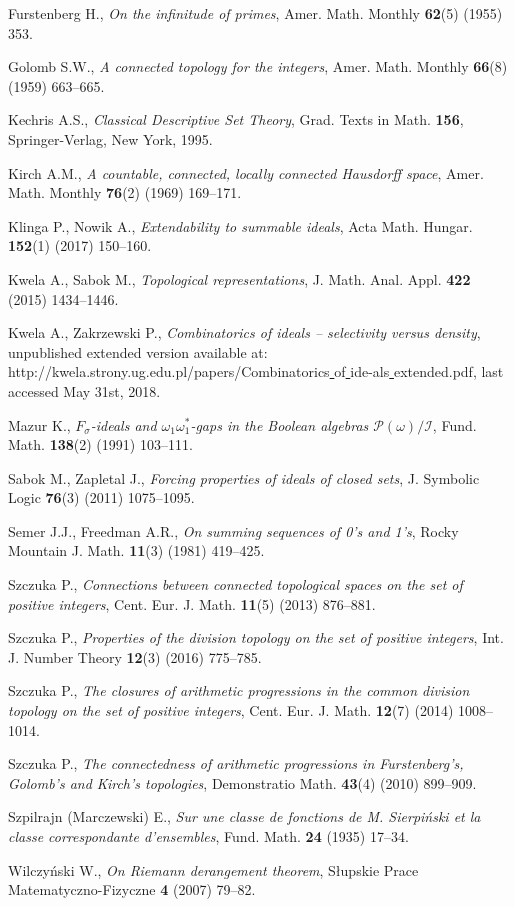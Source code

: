 \documentclass{amsart}
\theoremstyle{definition}
\begin{document}
\begin{thebibliography}{abc}
Furstenberg H., \emph{On the infinitude of primes},
Amer. Math. Monthly {\bf 62}(5) (1955) 353.

Golomb S.W., \emph{A connected topology for the integers},
Amer. Math. Monthly {\bf 66}(8) (1959) 663--665.

Kechris A.S., \emph{Classical Descriptive Set Theory},
Grad. Texts in Math. {\bf 156}, Springer-Verlag, New York, 1995.

Kirch A.M., \emph{A countable, connected, locally connected Hausdorff space},
Amer. Math. Monthly {\bf 76}(2) (1969) 169--171.

Klinga P., Nowik A., \emph{Extendability to summable ideals},
Acta Math. Hungar. {\bf 152}(1) (2017) 150--160.

Kwela A., Sabok M., \emph{Topological representations},
J. Math. Anal. Appl. {\bf 422} (2015) 1434--1446.

Kwela A., Zakrzewski P., \emph{Combinatorics of ideals -- selectivity versus density}, unpublished extended version available at:
http://kwela.strony.ug.edu.pl/papers/Combinatorics\underline{ }of\underline{ }ide-als\underline{ }extended.pdf,
last accessed May 31st, 2018.

Mazur K., \emph{$F_\sigma$-ideals and $\omega_1\omega_1^*$-gaps in the Boolean algebras $\mathcal{P}(\omega)/\mathcal{I}$},
Fund. Math. {\bf 138}(2) (1991) 103--111.

Sabok M., Zapletal J., \emph{Forcing properties of ideals of closed sets}, 
J. Symbolic Logic {\bf 76}(3) (2011) 1075--1095.

Semer J.J., Freedman A.R., \emph{On summing sequences of 0's and 1's},
Rocky Mountain J. Math. {\bf 11}(3) (1981) 419--425.

Szczuka P., \emph{Connections between connected topological spaces on the set of positive integers}, 
Cent. Eur. J. Math. {\bf 11}(5) (2013) 876--881.

Szczuka P., \emph{Properties of the division topology on the set of positive integers},
Int. J. Number Theory {\bf 12}(3) (2016) 775--785.

Szczuka P., \emph{The closures of arithmetic progressions in the common division topology on the set of positive integers},
Cent. Eur. J. Math. {\bf 12}(7) (2014) 1008--1014.

Szczuka P., \emph{The connectedness of arithmetic progressions in Furstenberg's, Golomb's and Kirch's topologies},
Demonstratio Math. {\bf 43}(4) (2010) 899--909.

Szpilrajn (Marczewski) E., \emph{Sur une classe de fonctions de M. Sierpi\'nski et la classe correspondante d'ensembles},
Fund. Math. {\bf 24} (1935) 17--34.

Wilczy\'nski W., \emph{On Riemann derangement theorem},
S\l{}upskie Prace Matematyczno-Fizyczne {\bf 4} (2007) 79--82.

\end{thebibliography}
\end{document}
